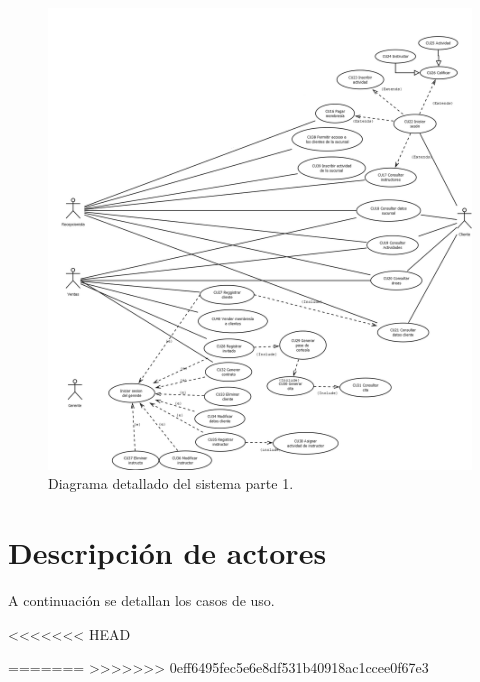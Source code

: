\begin{figure}[htbp]
	\begin{center}
		\includegraphics[angle=90, width=1.1\textwidth]{images/CUcompleto2}
		\caption{Diagrama detallado del sistema parte 1.}
		\label{fig:CUcompleto2}
	\end{center}
\end{figure}

\section{Descripción de actores}


A continuación se detallan los casos de uso.




<<<<<<< HEAD

=======
>>>>>>> 0eff6495fec5e6e8df531b40918ac1ccee0f67e3



